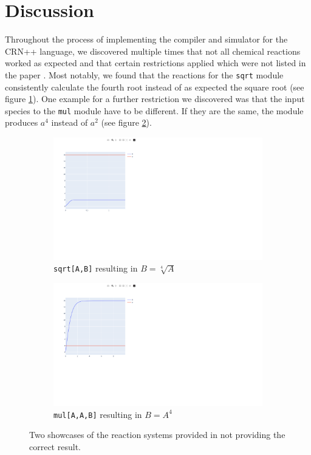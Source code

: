 \section{Discussion}

Throughout the process of implementing the compiler and simulator for the CRN++ language, we discovered multiple times that not all chemical reactions worked as expected and that certain restrictions applied which were not listed in the paper \cite{soloveichik2018a}. Most notably, we found that the reactions for the \texttt{sqrt} module consistently calculate the fourth root instead of as expected the square root (see figure \ref{fig:subfigure1}). One example for a further restriction we discovered was that the input species to the \texttt{mul} module have to be different. If they are the same, the module produces $a^4$ instead of $a^2$ (see figure \ref{fig:subfigure2}). 

\begin{figure}[h]
  \centering
  \begin{subfigure}[b]{0.49\textwidth}
    \includegraphics[width=\textwidth]{Figures/sqrt-plot.pdf}
    \caption{\texttt{sqrt[A,B]} resulting in $B=\sqrt[4]{A}$}
    \label{fig:subfigure1}
  \end{subfigure}
  \hfill
  \begin{subfigure}[b]{0.49\textwidth}
    \includegraphics[width=\textwidth]{Figures/mul-plot.pdf}
    \caption{\texttt{mul[A,A,B]} resulting in $B=A^4$}
    \label{fig:subfigure2}
  \end{subfigure}
  \caption{Two showcases of the reaction systems provided in \cite{soloveichik2018a} not providing the correct result.}
  \label{fig:crn-errors}
\end{figure}

